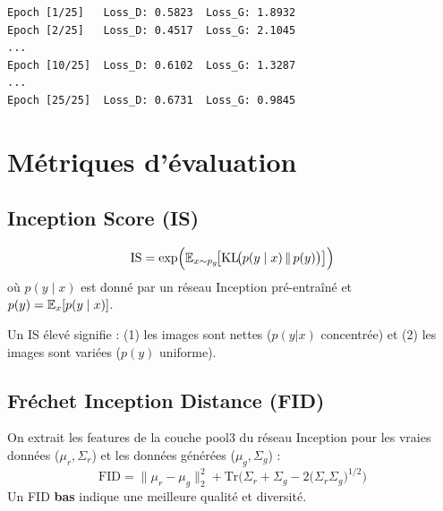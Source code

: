 \begin{codeoutput}
\begin{verbatim}
Epoch [1/25]   Loss_D: 0.5823  Loss_G: 1.8932
Epoch [2/25]   Loss_D: 0.4517  Loss_G: 2.1045
...
Epoch [10/25]  Loss_D: 0.6102  Loss_G: 1.3287
...
Epoch [25/25]  Loss_D: 0.6731  Loss_G: 0.9845
\end{verbatim}
\end{codeoutput}

\section{M\'etriques d'\'evaluation}
\label{sec:gan-metrics}

\subsection{Inception Score (IS)}

\begin{formules}[title=\textbf{Inception Score}]
\begin{equation}
\text{IS} = \exp\!\Big(\mathbb{E}_{x \sim p_g}\!\big[\mathrm{KL}\!\big(p(y \mid x) \,\|\, p(y)\big)\big]\Big)
\end{equation}
o\`u $p(y \mid x)$ est donn\'e par un r\'eseau Inception pr\'e-entra\^in\'e et $p(y) = \mathbb{E}_x[p(y \mid x)]$.

Un IS \'elev\'e signifie : (1) les images sont nettes ($p(y|x)$ concentr\'ee) et (2) les images sont vari\'ees ($p(y)$ uniforme).
\end{formules}

\subsection{Fr\'echet Inception Distance (FID)}

\begin{formules}[title=\textbf{Fr\'echet Inception Distance}]
On extrait les features de la couche pool3 du r\'eseau Inception pour les vraies donn\'ees ($\mu_r, \Sigma_r$) et les donn\'ees g\'en\'er\'ees ($\mu_g, \Sigma_g$) :
\begin{equation}
\text{FID} = \|\mu_r - \mu_g\|_2^2 + \text{Tr}\!\Big(\Sigma_r + \Sigma_g - 2\big(\Sigma_r \Sigma_g\big)^{1/2}\Big)
\label{eq:fid}
\end{equation}
Un FID \textbf{bas} indique une meilleure qualit\'e et diversit\'e.
\end{formules}

